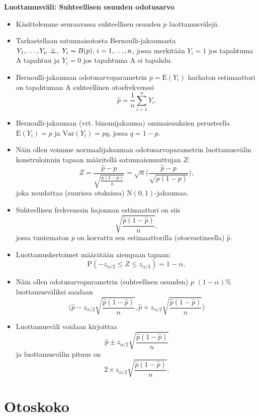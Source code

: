 \documentclass[
]{book}
\begin{document}
\hfill\break

\textbf{Luottamusväli: Suhteellisen osuuden odotusarvo}

\begin{itemize}
\item
  Käsittelemme seuraavassa suhteellisen osuuden \(p\) luottamusvälejä.
\item
  Tarkastellaan satunnaisotosta Bernoulli-jakaumasta
  \(Y_1, \ldots, Y_n \perp \!\!\! \perp, \,\, Y_i \thicksim B(p),\, i=1,\ldots,n\),
  jossa merkitään \(Y_i=1\) jos tapahtuma A tapahtuu ja \(Y_i=0\) jos tapahtuma A ei tapahdu.
\item
  Bernoulli-jakauman odotusarvoparametrin \(p=\text{E}(Y_i)\) harhaton estimaattori on tapahtuman A suhteellinen otosfrekvenssi
  \[
  \widehat{p} = \frac{1}{n} \sum_{i=1}^{n} Y_i.
  \]
\item
  Bernoulli-jakauman (vrt. binomijakauma) ominaisuuksien
  perusteella \(\text{E}(Y_i)=p\) ja \(\mathrm{Var}(Y_i)=pq\), jossa
  \(q=1-p\).
\item
  Näin ollen voimme normaalijakauman odotusarvoparametrin
  luottamusvälin konstruloinnin tapaan määritellä satunnaismuuttujan \(Z\):
  \[
  Z = \frac{\widehat{p} - p}{\sqrt{\frac{p (1-p)}{n}}} = 
  \sqrt{n} \Big(\frac{\widehat{p} - p}{\sqrt{p (1-p)}} \Big),  
  \]
  joka noudattaa (suurissa otoksissa) \(\text{N}(0,1)\)-jakaumaa.
\item
  Suhteellisen frekvenssin hajonnan estimaattori on siis
  \[
  \sqrt{\frac{\widehat{p} (1-\widehat{p})}{n}},
  \]
  jossa tuntematon \(p\) on korvattu sen estimaattorilla (otosvastineella) \(\widehat{p}\).
\item
  Luottamuskertoimet määrätään aiempaan tapaan:
  \[
  \text{P}(-z_{\alpha/2} \le Z \le z_{\alpha/2}) = 1-\alpha,
  \]
\item
  Näin ollen odotusarvoparametrin (suhteellisen osuuden) \(p\) \((1-\alpha)\)\% luottamusväliksi
  saadaan
  \[
  \Big(
  \widehat{p} - z_{\alpha/2} \sqrt{\frac{\widehat{p}(1-\widehat{p})}{n}},
  \widehat{p} + z_{\alpha/2} \sqrt{\frac{\widehat{p}(1-\widehat{p})}{n}} 
  \Big)
  \]
\item
  Luottamusväli voidaan kirjoittaa
  \[
  \widehat{p} \pm z_{\alpha/2} \sqrt{\frac{\widehat{p}(1-\widehat{p})}{n}}
  \]
  ja luottamusvälin pituus on
  \[
  2 \times z_{\alpha/2} \sqrt{\frac{\widehat{p}(1-\widehat{p})}{n}}.
  \]
\end{itemize}

\hypertarget{alaluku97}{%
\section{Otoskoko}\label{alaluku97}}
\end{document}
